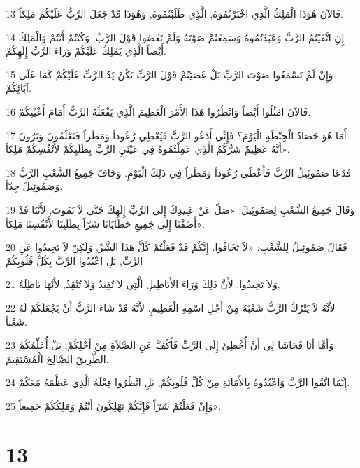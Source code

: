 \par 13 فَالآنَ هُوَذَا الْمَلِكُ الَّذِي اخْتَرْتُمُوهُ, الَّذِي طَلَبْتُمُوهُ, وَهُوَذَا قَدْ جَعَلَ الرَّبُّ عَلَيْكُمْ مَلِكاً.
\par 14 إِنِ اتَّقَيْتُمُ الرَّبَّ وَعَبَدْتُمُوهُ وَسَمِعْتُمْ صَوْتَهُ وَلَمْ تَعْصُوا قَوْلَ الرَّبِّ, وَكُنْتُمْ أَنْتُمْ وَالْمَلِكُ أَيْضاً الَّذِي يَمْلِكُ عَلَيْكُمْ وَرَاءَ الرَّبِّ إِلَهِكُمْ.
\par 15 وَإِنْ لَمْ تَسْمَعُوا صَوْتَ الرَّبِّ بَلْ عَصَيْتُمْ قَوْلَ الرَّبِّ تَكُنْ يَدُ الرَّبِّ عَلَيْكُمْ كَمَا عَلَى آبَائِكُمْ.
\par 16 فَالآنَ امْثُلُوا أَيْضاً وَانْظُرُوا هَذَا الأَمْرَ الْعَظِيمَ الَّذِي يَفْعَلُهُ الرَّبُّ أَمَامَ أَعْيُنِكُمْ.
\par 17 أَمَا هُوَ حَصَادُ الْحِنْطَةِ الْيَوْمَ؟ فَإِنِّي أَدْعُو الرَّبَّ فَيُعْطِي رُعُوداً وَمَطَراً فَتَعْلَمُونَ وَتَرُونَ أَنَّهُ عَظِيمٌ شَرُّكُمُ الَّذِي عَمِلْتُمُوهُ فِي عَيْنَيِ الرَّبِّ بِطَلَبِكُمْ لأَنْفُسِكُمْ مَلِكاً».
\par 18 فَدَعَا صَمُوئِيلُ الرَّبَّ فَأَعْطَى رُعُوداً وَمَطَراً فِي ذَلِكَ الْيَوْمِ. وَخَافَ جَمِيعُ الشَّعْبِ الرَّبَّ وَصَمُوئِيلَ جِدّاً.
\par 19 وَقَالَ جَمِيعُ الشَّعْبِ لِصَمُوئِيلَ: «صَلِّ عَنْ عَبِيدِكَ إِلَى الرَّبِّ إِلَهِكَ حَتَّى لاَ نَمُوتَ, لأَنَّنَا قَدْ أَضَفْنَا إِلَى جَمِيعِ خَطَايَانَا شَرّاً بِطَلَبِنَا لأَنْفُسِنَا مَلِكاً».
\par 20 فَقَالَ صَمُوئِيلُ لِلشَّعْبِ: «لاَ تَخَافُوا. إِنَّكُمْ قَدْ فَعَلْتُمْ كُلَّ هَذَا الشَّرِّ, وَلَكِنْ لاَ تَحِيدُوا عَنِ الرَّبِّ, بَلِ اعْبُدُوا الرَّبَّ بِكُلِّ قُلُوبِكُمْ
\par 21 وَلاَ تَحِيدُوا. لأَنَّ ذَلِكَ وَرَاءَ الأَبَاطِيلِ الَّتِي لاَ تُفِيدُ وَلاَ تُنْقِذُ, لأَنَّهَا بَاطِلَةٌ.
\par 22 لأَنَّهُ لاَ يَتْرُكُ الرَّبُّ شَعْبَهُ مِنْ أَجْلِ اسْمِهِ الْعَظِيمِ. لأَنَّهُ قَدْ شَاءَ الرَّبُّ أَنْ يَجْعَلَكُمْ لَهُ شَعْباً.
\par 23 وَأَمَّا أَنَا فَحَاشَا لِي أَنْ أُخْطِئَ إِلَى الرَّبِّ فَأَكُفَّ عَنِ الصَّلاَةِ مِنْ أَجْلِكُمْ, بَلْ أُعَلِّمُكُمُ الطَّرِيقَ الصَّالِحَ الْمُسْتَقِيمَ.
\par 24 إِنَّمَا اتَّقُوا الرَّبَّ وَاعْبُدُوهُ بِالأَمَانَةِ مِنْ كُلِّ قُلُوبِكُمْ, بَلِ انْظُرُوا فِعْلَهُ الَّذِي عَظَّمَهُ مَعَكُمْ.
\par 25 وَإِنْ فَعَلْتُمْ شَرّاً فَإِنَّكُمْ تَهْلِكُونَ أَنْتُمْ وَمَلِكُكُمْ جَمِيعاً».

\chapter{13}

